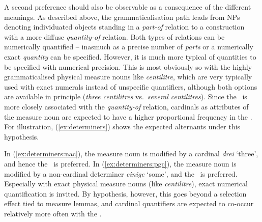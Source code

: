 A second preference should also be observable as a consequence of the different meanings.
As described above, the grammaticalisation path leads from NPs denoting individuated objects standing in a \textit{part-of} relation to a construction with a more diffuse \textit{quantity-of} relation.
Both types of relations can be numerically quantified -- inasmuch as a precise number of \textit{parts} or a numerically exact \textit{quantity} can be specified.
However, it is much more typical of quantities to be specified with numerical precision.
This is most obviously so with the highly grammaticalised physical measure nouns like \textit{centilitre}, which are very typically used with exact numerals instead of unspecific quantifiers, although both options are available in principle (\textit{three centilitres} vs.\ \textit{several centilitres}).
Since the \NACa\ is more closely associated with the \textit{quantity-of} relation, cardinals as attributes of the measure noun are expected to have a higher proportional frequency in the \NACa.
For illustration, (\ref{ex:determiners}) shows the expected alternants under this hypothesis.

\begin{exe}
  \ex\label{ex:determiners} 
  \begin{xlist}
  \end{xlist}
\end{exe}

In (\ref{ex:determiners:nac}), the measure noun is modified by a cardinal \textit{drei} `three', and hence the \NACa\ is preferred.
In (\ref{ex:determiners:pgc}), the measure noun is modified by a non-cardinal determiner \textit{einige} `some', and the \PGCa\ is preferred.
Especially with exact physical measure nouns (like \textit{centilitre}), exact numerical quantification is invited.
By hypothesis, however, this goes beyond a selection effect tied to measure lemmas, and cardinal quantifiers are expected to co-occur relatively more often with the \NACa.

